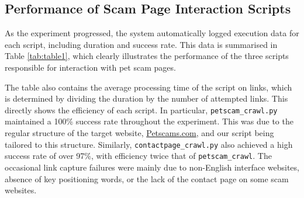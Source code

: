 \documentclass[ oneside,%
                    author={Cassie Qing Tang},
                    degree={BSc},
                     title={An Automated Response System for Disrupting Online Pet Scamming \\ },
                    subtitle={ }]{dissertation}
\begin{document}
\subsection{Performance of Scam Page Interaction Scripts}
As the experiment progressed, the system automatically logged execution data for each script, including duration and success rate. This data is summarised in Table \ref{tab:table1}, which clearly illustrates the performance of the three scripts responsible for interaction with pet scam pages.
{\small
\begin{table}[ht]
\centering
\renewcommand{\arraystretch}{1.5}
\caption{Summary of script performance metrics}
\label{tab:table1}
\end{table}
} 

The table also contains the average processing time of the script on links, which is determined by dividing the duration by the number of attempted links. This directly shows the efficiency of each script. In particular, \texttt{petscam\_crawl.py} maintained a 100\% success rate throughout the experiment. This was due to the regular structure of the target website, \href{www.petscams.com}{Petscams.com}, and our script being tailored to this structure. Similarly, \texttt{contactpage\_crawl.py} also achieved a high success rate of over 97\%, with efficiency twice that of \texttt{petscam\_crawl}. The occasional link capture failures were mainly due to non-English interface websites, absence of key positioning words, or the lack of the contact page on some scam websites.
\\
\end{document}
